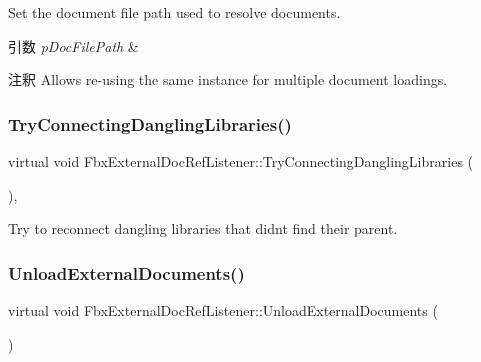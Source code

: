 Set the document file path used to resolve documents. 
\begin{DoxyParams}{引数}
{\em p\+Doc\+File\+Path} & \\
\hline
\end{DoxyParams}
\begin{DoxyRemark}{注釈}
Allows re-\/using the same instance for multiple document loadings. 
\end{DoxyRemark}
\mbox{\label{class_fbx_external_doc_ref_listener_a38eb0370ac40ed398430223cc2e9de5e}} 
\subsubsection{\texorpdfstring{Try\+Connecting\+Dangling\+Libraries()}{TryConnectingDanglingLibraries()}}
{\footnotesize\ttfamily virtual void Fbx\+External\+Doc\+Ref\+Listener\+::\+Try\+Connecting\+Dangling\+Libraries (\begin{DoxyParamCaption}{ }\end{DoxyParamCaption})\hspace{0.3cm}{\ttfamily [protected]}, {\ttfamily [virtual]}}



Try to reconnect dangling libraries that didn\textquotesingle{}t find their parent. 

\mbox{\label{class_fbx_external_doc_ref_listener_a0d2e5c292d9aad7263cb16b9008851f2}} 
\subsubsection{\texorpdfstring{Unload\+External\+Documents()}{UnloadExternalDocuments()}}
{\footnotesize\ttfamily virtual void Fbx\+External\+Doc\+Ref\+Listener\+::\+Unload\+External\+Documents (\begin{DoxyParamCaption}{ }\end{DoxyParamCaption})\hspace{0.3cm}{\ttfamily [virtual]}}

